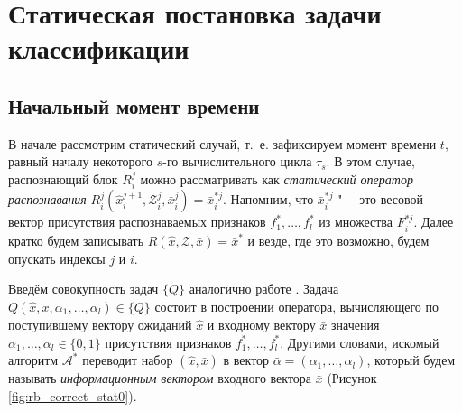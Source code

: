 \documentclass[a4paper, 12pt]{article}
\theoremstyle{plain}
\begin{document}
	\section{Статическая постановка задачи классификации}
	\subsection{Начальный момент времени}
	В начале рассмотрим статический случай, т.~е. зафиксируем момент времени $t$, равный началу некоторого $s$-го вычислительного цикла $\tau_s$. В этом случае, распознающий блок $R_i^j$ можно рассматривать как \textit{статический оператор распознавания} $R_i^j(\hat{x}_i^{j+1},\mathcal{Z}_i^j,\bar{x}_i^j)=\bar{x}_i^{*j}$. Напомним, что $\bar{x}_i^{*j}$ "--- это весовой вектор присутствия распознаваемых признаков $f_1^*,\dots,f_l^*$ из множества $F_i^{*j}$. Далее кратко будем записывать $R(\hat{x},\mathcal{Z},\bar{x})=\bar{x}^*$ и везде, где это возможно, будем опускать индексы $j$ и $i$.
	
	Введём совокупность задач $\{Q\}$ аналогично работе \cite{Zhuravlev1977}. Задача $Q(\hat{x},\bar{x},\alpha_1,\dots,\alpha_l)\in\{Q\}$ состоит в построении оператора, вычисляющего по поступившему вектору ожиданий $\hat{x}$ и входному вектору $\bar{x}$ значения $\alpha_1,\dots,\alpha_l\in\{0,1\}$ присутствия признаков $f_1^*,\dots,f_l^*$. Другими словами, искомый алгоритм $\mathcal{A}^*$ переводит набор $(\hat{x},\bar{x})$ в вектор $\bar{\alpha}=(\alpha_1,\dots,\alpha_l)$, который будем называть \textit{информационным вектором} входного вектора $\bar{x}$ (Рисунок \ref{fig:rb_correct_stat0}).
	
\end{document}
